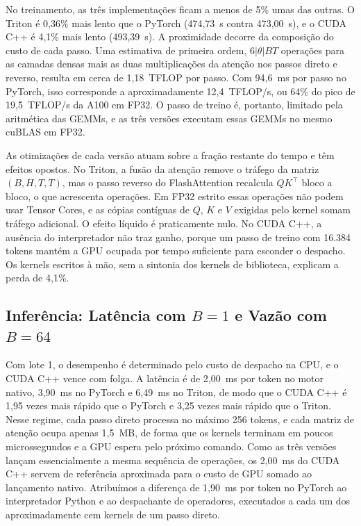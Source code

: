 \documentclass[conference]{IEEEtran}
\begin{document}
No treinamento, as três implementações ficam a menos de 5\% umas das outras. O Triton é 0,36\% mais lento que o PyTorch (474,73~s contra 473,00~s), e o CUDA C++ é 4,1\% mais lento (493,39~s). A proximidade decorre da composição do custo de cada passo. Uma estimativa de primeira ordem, $6|\theta|BT$ operações para as camadas densas mais as duas multiplicações da atenção nos passos direto e reverso, resulta em cerca de 1,18~TFLOP por passo. Com 94,6~ms por passo no PyTorch, isso corresponde a aproximadamente 12,4~TFLOP/s, ou 64\% do pico de 19,5~TFLOP/s da A100 em FP32. O passo de treino é, portanto, limitado pela aritmética das GEMMs, e as três versões executam essas GEMMs no mesmo cuBLAS em FP32.

As otimizações de cada versão atuam sobre a fração restante do tempo e têm efeitos opostos. No Triton, a fusão da atenção remove o tráfego da matriz $(B,H,T,T)$, mas o passo reverso do FlashAttention recalcula $QK^\top$ bloco a bloco, o que acrescenta operações. Em FP32 estrito essas operações não podem usar Tensor Cores, e as cópias contíguas de $Q$, $K$ e $V$ exigidas pelo kernel somam tráfego adicional. O efeito líquido é praticamente nulo. No CUDA C++, a ausência do interpretador não traz ganho, porque um passo de treino com 16.384 tokens mantém a GPU ocupada por tempo suficiente para esconder o despacho. Os kernels escritos à mão, sem a sintonia dos kernels de biblioteca, explicam a perda de 4,1\%.

\subsection{\texorpdfstring{Inferência: Latência com $B=1$ e Vazão com $B=64$}{Inferência: Latência com B=1 e Vazão com B=64}}

Com lote 1, o desempenho é determinado pelo custo de despacho na CPU, e o CUDA C++ vence com folga. A latência é de 2,00~ms por token no motor nativo, 3,90~ms no PyTorch e 6,49~ms no Triton, de modo que o CUDA C++ é 1,95 vezes mais rápido que o PyTorch e 3,25 vezes mais rápido que o Triton. Nesse regime, cada passo direto processa no máximo 256 tokens, e cada matriz de atenção ocupa apenas 1,5~MB, de forma que os kernels terminam em poucos microssegundos e a GPU espera pelo próximo comando. Como as três versões lançam essencialmente a mesma sequência de operações, os 2,00~ms do CUDA C++ servem de referência aproximada para o custo de GPU somado ao lançamento nativo. Atribuímos a diferença de 1,90~ms por token no PyTorch ao interpretador Python e ao despachante de operadores, executados a cada um dos aproximadamente cem kernels de um passo direto.
\end{document}
